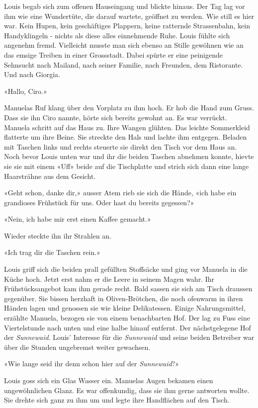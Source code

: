 Louis begab sich zum offenen Hauseingang und blickte hinaus. Der Tag lag vor ihm wie eine Wundertüte, die darauf wartete, geöffnet zu werden. Wie still es hier war. Kein Hupen, kein geschäftiges Plappern, keine ratternde Strassenbahn, kein Handyklingeln - nichts als diese alles einnehmende Ruhe. Louis fühlte sich angenehm fremd. Vielleicht musste man sich ebenso an Stille gewöhnen wie an das emsige Treiben in einer Grossstadt. Dabei spürte er eine peinigende Sehnsucht nach Mailand, nach seiner Familie, nach Freunden, dem Ristorante. Und nach Giorgia.

«Hallo, Ciro.»

Manuelas Ruf klang über den Vorplatz zu ihm hoch.
Er hob die Hand zum Gruss. Dass sie ihn Ciro nannte, hörte sich bereits
gewohnt an. Es war verrückt.
Manuela schritt auf das Haus zu. Ihre Wangen glühten. Das leichte
Sommerkleid flatterte um ihre Beine. Sie streckte den Hals und lachte
ihm entgegen. Beladen mit Taschen links und rechts steuerte sie direkt
den Tisch vor dem Haus an. Noch bevor Louis unten war und ihr die beiden
Taschen abnehmen konnte, hievte sie sie mit einem «Uff» beide auf die
Tischplatte und strich sich dann eine lange Haarsträhne aus dem Gesicht.

«Geht schon, danke dir,» ausser Atem rieb sie sich die Hände, «ich habe
ein grandioses Frühstück für uns. Oder hast du bereits gegessen?»

«Nein, ich habe mir erst einen Kaffee gemacht.»

Wieder steckte ihn ihr Strahlen an.

«Ich trag dir die Taschen rein.»

Louis griff sich die beiden prall gefüllten Stoffsäcke und ging vor
Manuela in die Küche hoch. Jetzt erst nahm er die Leere in seinem Magen
wahr. Ihr Frühstücksangebot kam ihm gerade recht. 
Bald sassen sie sich am Tisch draussen gegenüber. Sie bissen herzhaft in
Oliven-Brötchen, die noch ofenwarm in ihren Händen lagen und genossen
sie wie kleine Delikatessen. Einige Nahrungsmittel, erzählte Manuela,
bezogen sie von einem benachbarten Hof. Der lag zu Fuss eine
Viertelstunde nach unten und eine halbe hinauf entfernt. Der
nächstgelegene Hof der \emph{Sunnewaid}.
Louis’ Interesse für die \emph{Sunnewaid} und seine beiden Betreiber war
über die Stunden ungebremst weiter gewachsen.

«Wie lange seid ihr denn schon hier auf der \emph{Sunnewaid}?»

Louis goss sich ein Glas Wasser ein. Manuelas Augen bekamen einen
ungewöhnlichen Glanz. Es war offenkundig, dass sie ihm gerne antworten
wollte. Sie drehte sich ganz zu ihm um und legte ihre Handflächen auf
den Tisch.

